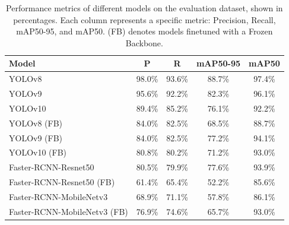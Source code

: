 \documentclass[10pt,twocolumn,letterpaper]{article}
\begin{document}
\begin{table}[thb]
    \scriptsize
    \centering
    \begin{tabular}{lcccc}
        \toprule
        \textbf{Model}          & \textbf{P} & \textbf{R} & \textbf{mAP50-95} & \textbf{mAP50} \\
        \midrule
        YOLOv8                  & 98.0\%     & 93.6\%     & 88.7\%            & 97.4\%         \\
        YOLOv9                  & 95.6\%     & 92.2\%     & 82.3\%            & 96.1\%         \\
        YOLOv10                 & 89.4\%     & 85.2\%     & 76.1\%            & 92.2\%         \\
        YOLOv8 (FB)             & 84.0\%     & 82.5\%     & 68.5\%            & 88.7\%         \\
        YOLOv9 (FB)             & 84.0\%     & 82.5\%     & 77.2\%            & 94.1\%         \\
        YOLOv10 (FB)            & 80.8\%     & 80.2\%     & 71.2\%            & 93.0\%         \\
        Faster-RCNN-Resnet50         & 80.5\%     & 79.9\%     & 77.6\%            & 93.9\%         \\
        Faster-RCNN-Resnet50 (FB)    & 61.4\%     & 65.4\%     & 52.2\%            & 85.6\%         \\
        Faster-RCNN-MobileNetv3      & 68.9\%     & 71.1\%     & 57.8\%            & 86.1\%         \\
        Faster-RCNN-MobileNetv3 (FB) & 76.9\%     & 74.6\%     & 65.7\%            & 93.0\%         \\
        \bottomrule
    \end{tabular}
    \caption{Performance metrics of different models on the evaluation dataset, shown in percentages. Each column represents a specific metric: Precision, Recall, mAP50-95, and mAP50. (FB) denotes models finetuned with a Frozen Backbone.}
    \label{tab:metrics-results}
\end{table}
\end{document}
